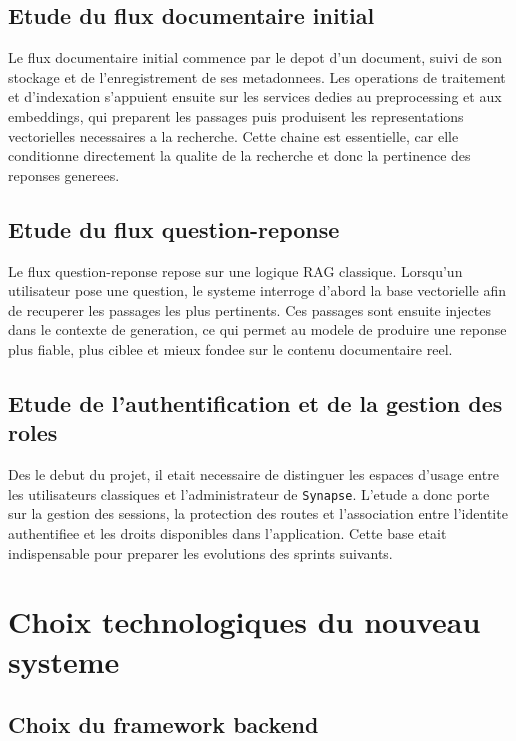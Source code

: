 \subsection{Etude du flux documentaire initial}

Le flux documentaire initial commence par le depot d'un document, suivi de son stockage et de l'enregistrement de ses metadonnees. Les operations de traitement et d'indexation s'appuient ensuite sur les services dedies au preprocessing et aux embeddings, qui preparent les passages puis produisent les representations vectorielles necessaires a la recherche. Cette chaine est essentielle, car elle conditionne directement la qualite de la recherche et donc la pertinence des reponses generees.

\subsection{Etude du flux question-reponse}

Le flux question-reponse repose sur une logique RAG classique. Lorsqu'un utilisateur pose une question, le systeme interroge d'abord la base vectorielle afin de recuperer les passages les plus pertinents. Ces passages sont ensuite injectes dans le contexte de generation, ce qui permet au modele de produire une reponse plus fiable, plus ciblee et mieux fondee sur le contenu documentaire reel.

\subsection{Etude de l'authentification et de la gestion des roles}

Des le debut du projet, il etait necessaire de distinguer les espaces d'usage entre les utilisateurs classiques et l'administrateur de \texttt{Synapse}. L'etude a donc porte sur la gestion des sessions, la protection des routes et l'association entre l'identite authentifiee et les droits disponibles dans l'application. Cette base etait indispensable pour preparer les evolutions des sprints suivants.

\section{Choix technologiques du nouveau systeme}

\subsection{Choix du framework backend}


